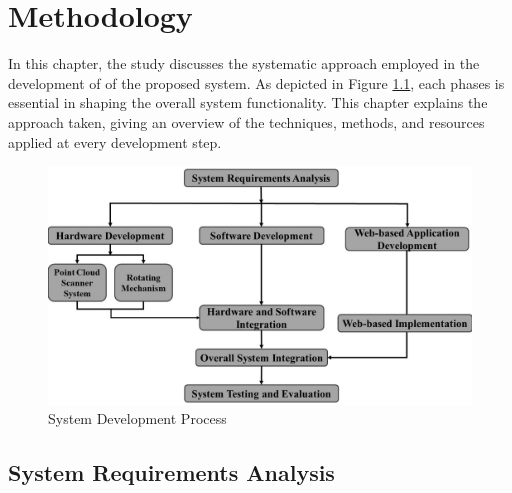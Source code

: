 \renewcommand{\thechapter}{\Roman{chapter}}
\chapter{Methodology}
\renewcommand{\thechapter}{\arabic{chapter}}
\label{ch4:Methodology}
\thispagestyle{empty}

In this chapter, the study discusses the systematic approach employed in the development of of the proposed system. As depicted in Figure \ref{ch4:fig:system_development_process}, each phases is essential in shaping the overall system functionality. This chapter explains the approach taken, giving an overview of the techniques, methods, and resources applied at every development step.

\begin{figure}[H]
	\centering
	\includegraphics[width=1\textwidth]{Figures/system_development_process}
	\caption{System Development Process}
	\label{ch4:fig:system_development_process}
\end{figure}

\section{System Requirements Analysis}
\label{ch4:sec:system_requirements_analysis}

